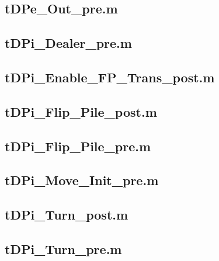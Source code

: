 \documentclass[runningheads,a4paper]{llncs}
\newcommand{\GPenSIM}{../GPenSIM}
\begin{document}
\subsection{tDPe\_Out\_pre.m}
\label{app:tDPe_Out_pre}


\subsection{tDPi\_Dealer\_pre.m}
\label{app:tDPi_Dealer_pre}


\subsection{tDPi\_Enable\_FP\_Trans\_post.m}
\label{app:tDPi_Enable_FP_Trans_post}


\subsection{tDPi\_Flip\_Pile\_post.m}
\label{app:tDPi_Flip_Pile_post}


\subsection{tDPi\_Flip\_Pile\_pre.m}
\label{app:tDPi_Flip_Pile_pre}


\subsection{tDPi\_Move\_Init\_pre.m}
\label{app:tDPi_Move_Init_pre}


\subsection{tDPi\_Turn\_post.m}
\label{app:tDPi_Turn_post}


\subsection{tDPi\_Turn\_pre.m}
\label{app:tDPi_Turn_pre}

\end{document}
